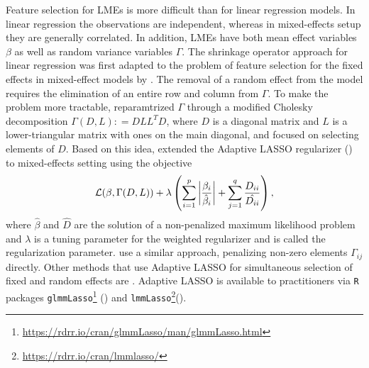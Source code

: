  Feature selection for LMEs is more difficult than for linear regression models. 
 In linear regression the observations are independent, whereas in mixed-effects setup they are generally correlated. 
 In addition, LMEs have both mean effect variables  $\beta$ as well as random variance variables 
 $\Gamma$. %
The shrinkage operator approach for linear regression 
\citep{Tibshirani1996} was first adapted 
to the problem of feature selection for the fixed effects in mixed-effect models by \cite{Lan2006}. 
The removal of a random effect from the model requires the elimination of an entire row and column from $\Gamma$. 
To make the problem more tractable, \cite{Chen2003} reparamtrized $\Gamma$ through a modified Cholesky decomposition $\Gamma(D,L): = DLL^TD$, where $D$ is a diagonal matrix and $L$ is a lower-triangular matrix with ones on the main diagonal, and focused on selecting elements of $D$. 
Based on this idea, \cite{Krishna2008} extended the Adaptive LASSO regularizer (\cite{Lan2006, Xu2015}) to mixed-effects setting using the objective
   \[
        \operatorname{\mathcal{L}}(\beta, \Gamma(D,L)) + \lambda\left(\sum_{i = 1}^p 
        \left|\frac{\beta_i}{\hat\beta_i}\right| + \sum_{j = 1}^q \frac{D_{ii}}{\hat{D_{ii}}} \right),
   \]
 where $\hat\beta$ and $\hat{D}$ are the solution of a non-penalized maximum likelihood problem and $\lambda$ is a tuning parameter for the weighted regularizer
 and is called the regularization parameter. 
 \cite{Ibrahim2011} use a similar approach, penalizing  non-zero elements $\Gamma_{ij}$ directly. 
 Other methods that use Adaptive LASSO for simultaneous selection 
 of fixed and random effects are \cite{Lin2013, fan2014robust, pan2018simultaneous}. Adaptive LASSO is available to practitioners via \texttt{R} packages \texttt{glmmLasso}\footnote{\href{https://rdrr.io/cran/glmmLasso/man/glmmLasso.html}{https://rdrr.io/cran/glmmLasso/man/glmmLasso.html}} (\cite{groll2014variable}) and \texttt{lmmLasso}\footnote{\href{https://rdrr.io/cran/lmmlasso/}{https://rdrr.io/cran/lmmlasso/}}(\cite{schelldorfer2011estimation}).

